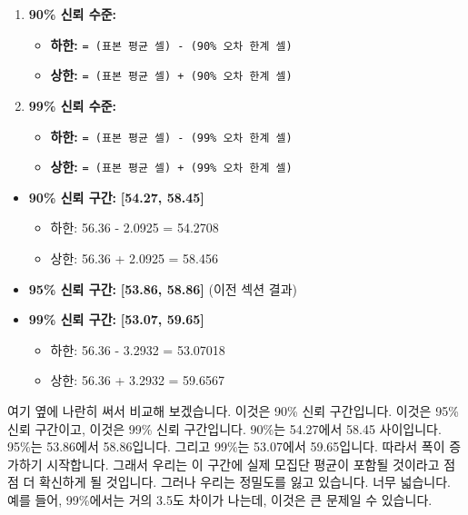 \documentclass[11pt,a4paper]{book}
\theoremstyle{definition}
\begin{document}
\begin{enumerate}
    \item \textbf{90\% 신뢰 수준:}
        \begin{itemize}
            \item \textbf{하한:} \texttt{= (표본 평균 셀) - (90\% 오차 한계 셀)}
            \item \textbf{상한:} \texttt{= (표본 평균 셀) + (90\% 오차 한계 셀)}
        \end{itemize}
    \item \textbf{99\% 신뢰 수준:}
        \begin{itemize}
            \item \textbf{하한:} \texttt{= (표본 평균 셀) - (99\% 오차 한계 셀)}
            \item \textbf{상한:} \texttt{= (표본 평균 셀) + (99\% 오차 한계 셀)}
        \end{itemize}
\end{enumerate}
\begin{infobox}[title=계산 결과: 신뢰 수준별 신뢰 구간]
\begin{itemize}
    \item \textbf{90\% 신뢰 구간:} \textbf{[54.27, 58.45]}
        \begin{itemize}
            \item 하한: 56.36 - 2.0925 = 54.2708
            \item 상한: 56.36 + 2.0925 = 58.456
        \end{itemize}
    \item \textbf{95\% 신뢰 구간:} \textbf{[53.86, 58.86]} (이전 섹션 결과)
    \item \textbf{99\% 신뢰 구간:} \textbf{[53.07, 59.65]}
        \begin{itemize}
            \item 하한: 56.36 - 3.2932 = 53.07018
            \item 상한: 56.36 + 3.2932 = 59.6567
        \end{itemize}
\end{itemize}
\end{infobox}

\begin{tcolorbox}[title={슬라이드 66: 뉴욕 일일 기온 샘플 Excel 시트 (13/13)}]
여기 옆에 나란히 써서 비교해 보겠습니다. 이것은 90\% 신뢰 구간입니다. 이것은 95\% 신뢰 구간이고, 이것은 99\% 신뢰 구간입니다. 90\%는 54.27에서 58.45 사이입니다. 95\%는 53.86에서 58.86입니다. 그리고 99\%는 53.07에서 59.65입니다. 따라서 폭이 증가하기 시작합니다. 그래서 우리는 이 구간에 실제 모집단 평균이 포함될 것이라고 점점 더 확신하게 될 것입니다. 그러나 우리는 정밀도를 잃고 있습니다. 너무 넓습니다. 예를 들어, 99\%에서는 거의 3.5도 차이가 나는데, 이것은 큰 문제일 수 있습니다.
\end{tcolorbox}
\end{document}
